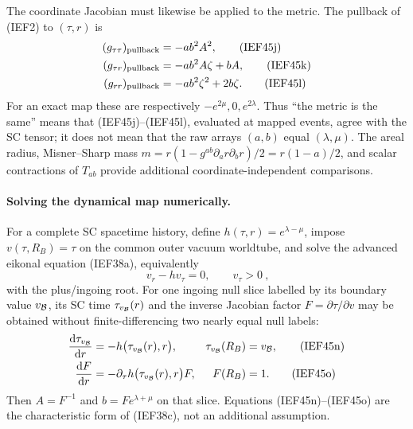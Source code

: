 The coordinate Jacobian must likewise be applied to the metric.  The pullback
of (IEF2) to \((\tau,r)\) is
\begin{align}
 (g_{\tau\tau})_{\rm pullback}&=-ab^2A^2,                 \tag{IEF45j}\\
 (g_{\tau r})_{\rm pullback}&=-ab^2A\zeta+bA,            \tag{IEF45k}\\
 (g_{rr})_{\rm pullback}&=-ab^2\zeta^2+2b\zeta.          \tag{IEF45l}
\end{align}
For an exact map these are respectively
\(-e^{2\mu},0,e^{2\lambda}\).  Thus ``the metric is the same'' means that
(IEF45j)--(IEF45l), evaluated at mapped events, agree with the SC tensor; it
does not mean that the raw arrays \((a,b)\) equal \((\lambda,\mu)\).
The areal radius, Misner--Sharp mass
\(m=r(1-g^{ab}\partial_a r\partial_b r)/2=r(1-a)/2\), and scalar contractions
of \(T_{ab}\) provide additional coordinate-independent comparisons.

\paragraph{Solving the dynamical map numerically.}
For a complete SC spacetime history, define
\(h(\tau,r)=e^{\lambda-\mu}\), impose
\(v(\tau,R_B)=\tau\) on the common outer vacuum worldtube, and solve
the advanced eikonal equation (IEF38a), equivalently
\[
 \boxed{\ v_r-hv_\tau=0,\qquad v_\tau>0\ },            \tag{IEF45m}
\]
with the plus/ingoing root.  For one ingoing null slice labelled by its
boundary value \(v_{\cal B}\), its SC time \(\tau_{v_{\cal B}}(r)\) and the
inverse Jacobian factor \(F=\partial\tau/\partial v\) may be obtained without
finite-differencing two nearly equal null labels:
\begin{align}
 \frac{\mathrm d\tau_{v_{\cal B}}}{\mathrm d r}
 &=-h\bigl(\tau_{v_{\cal B}}(r),r\bigr),
 &\tau_{v_{\cal B}}(R_B)&=v_{\cal B},                  \tag{IEF45n}\\
 \frac{\mathrm d F}{\mathrm d r}
 &=-\partial_\tau h\bigl(\tau_{v_{\cal B}}(r),r\bigr)F,
 &F(R_B)&=1.                                             \tag{IEF45o}
\end{align}
Then \(A=F^{-1}\) and \(b=F e^{\lambda+\mu}\) on that slice.  Equations
(IEF45n)--(IEF45o) are the characteristic form of (IEF38c), not an additional
assumption.

